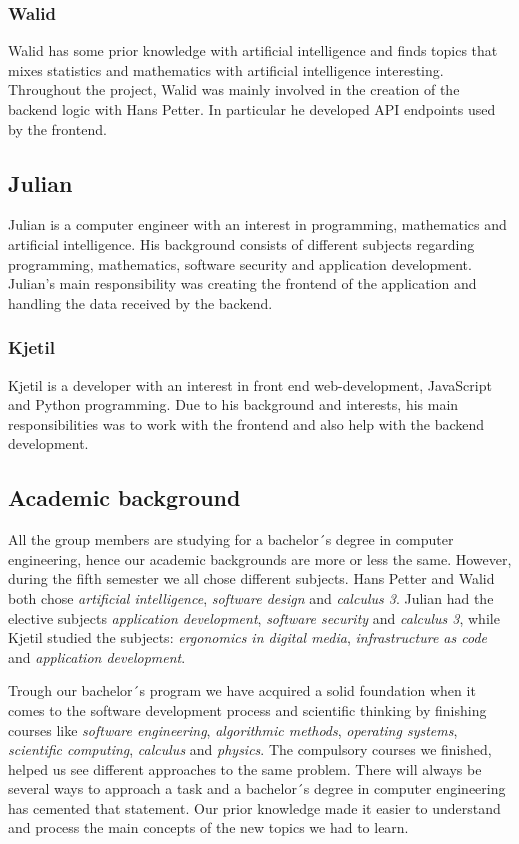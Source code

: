 \subsubsection*{Walid}
Walid has some prior knowledge with artificial intelligence and finds topics that mixes statistics and mathematics with artificial intelligence interesting. Throughout the project, Walid was mainly involved in the creation of the backend logic with Hans Petter. In particular he developed API endpoints used by the frontend. 

\subsection*{Julian}
Julian is a computer engineer with an interest in programming, mathematics and artificial intelligence. His background consists of different subjects regarding programming, mathematics, software security and application development. Julian's main responsibility was creating the frontend of the application and handling the data received by the backend. 

\subsubsection*{Kjetil}
Kjetil is a developer with an interest in front end web-development, JavaScript and Python programming. Due to his background and interests, his main responsibilities was to work with the frontend and also help with the backend development. 


\subsection{Academic background}
\label{section:academic background}
All the group members are studying for a bachelor´s degree in computer engineering, hence our academic backgrounds are more or less the same. However, during the fifth semester we all chose different subjects. Hans Petter and Walid both chose \textit{artificial intelligence}, \textit{software design} and \textit{calculus 3}. Julian had the elective subjects \textit{application development}, \textit{software security} and \textit{calculus 3}, while Kjetil studied the subjects: \textit{ergonomics in digital media}, \textit{infrastructure as code} and \textit{application development}. 

Trough our bachelor´s program we have acquired a solid foundation when it comes to the software development process and scientific thinking by finishing courses like \textit{software engineering}, \textit{algorithmic methods}, \textit{operating systems}, \textit{scientific computing}, \textit{calculus} and \textit{physics}. The compulsory courses we finished, helped us see different approaches to the same problem. There will always be several ways to approach a task and a bachelor´s degree in computer engineering has cemented that statement. Our prior knowledge made it easier to understand and process the main concepts of the new topics we had to learn. 

